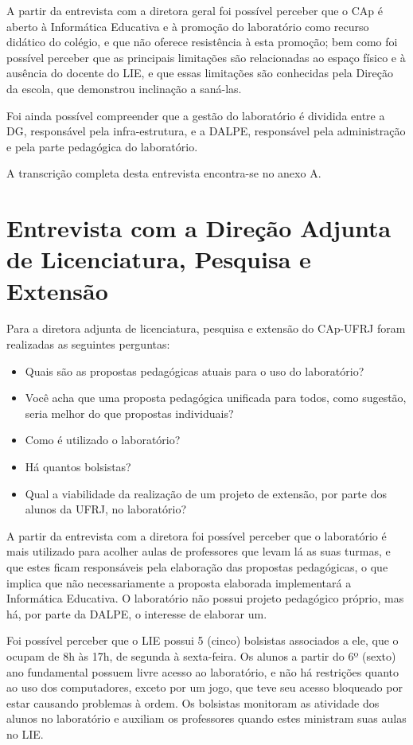 A partir da entrevista com a diretora geral foi possível perceber que o CAp é aberto à Informática Educativa e à promoção do laboratório como recurso didático do colégio, e que não oferece resistência à esta promoção; bem como foi possível perceber que as principais limitações são relacionadas ao espaço físico e à ausência do docente do LIE, e que essas limitações são conhecidas pela Direção da escola, que demonstrou inclinação a saná-las.

Foi ainda possível compreender que a gestão do laboratório é dividida entre a DG, responsável pela infra-estrutura, e a DALPE, responsável pela administração e pela parte pedagógica do laboratório.

A transcrição completa desta entrevista encontra-se no anexo A.

\section{Entrevista com a Direção Adjunta de Licenciatura, Pesquisa e Extensão}\label{chp:LABEL_CHP_ENT_SEC_DALPE}

Para a diretora adjunta de licenciatura, pesquisa e extensão do CAp-UFRJ foram realizadas as seguintes perguntas:

\begin{itemize}
\item{Quais são as propostas pedagógicas atuais para o uso do laboratório?}
\item{Você acha que uma proposta pedagógica unificada para todos, como sugestão, seria melhor do que propostas individuais?}
\item{Como é utilizado o laboratório?}
\item{Há quantos bolsistas?}
\item{Qual a viabilidade da realização de um projeto de extensão, por parte dos alunos da UFRJ, no laboratório?}
\end{itemize}

A partir da entrevista com a diretora foi possível perceber que o laboratório é mais utilizado para acolher aulas de professores que levam lá as suas turmas, e que estes ficam responsáveis pela elaboração das propostas pedagógicas, o que implica que não necessariamente a proposta elaborada implementará a Informática Educativa. O laboratório não possui projeto pedagógico próprio, mas há, por parte da DALPE, o interesse de elaborar um.

Foi possível perceber que o LIE possui 5 (cinco) bolsistas associados a ele, que o ocupam de 8h às 17h, de segunda à sexta-feira. Os alunos a partir do 6º (sexto) ano fundamental possuem livre acesso ao laboratório, e não há restrições quanto ao uso dos computadores, exceto por um jogo, que teve seu acesso bloqueado por estar causando problemas à ordem. Os bolsistas monitoram as atividade dos alunos no laboratório e auxiliam os professores quando estes ministram suas aulas no LIE.

